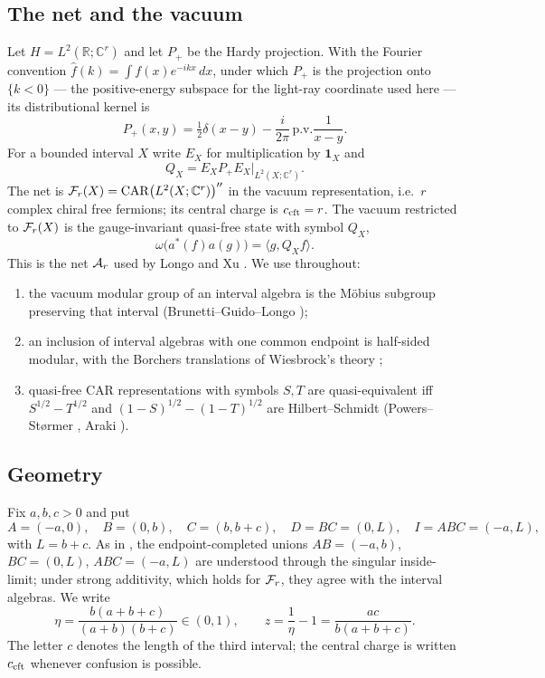 \label{sec:setting}
\subsection{The net and the vacuum}
Let $H=L^2(\mathbb R;\mathbb C^r)$ and let $P_+$ be the Hardy projection.  With the
Fourier convention $\widehat f(k)=\int f(x)e^{-ikx}\,dx$, under which $P_+$ is the
projection onto $\{k<0\}$ --- the positive-energy subspace for the light-ray
coordinate used here --- its distributional kernel is
\begin{equation}\label{eq:hardy}
 P_+(x,y)=\tfrac12\delta(x-y)-\frac{i}{2\pi}\,\mathrm{p.v.}\frac1{x-y}.
\end{equation}
For a bounded interval $X$ write $E_X$ for multiplication by $\mathbf 1_X$ and
\begin{equation}\label{eq:QX}
 Q_X=E_XP_+E_X\big|_{L^2(X;\mathbb C^r)} .
\end{equation}
The net is $\mathcal F_r(X)=\mathrm{CAR}\bigl(L^2(X;\mathbb C^r)\bigr)''$ in the vacuum
representation, i.e.\ $r$ complex chiral free fermions; its central charge is
$c_{\rm cft}=r$.  The vacuum restricted to $\mathcal F_r(X)$ is the gauge-invariant
quasi-free state with symbol $Q_X$,
\begin{equation}\label{eq:qf}
 \omega\bigl(a^*(f)a(g)\bigr)=\langle g,Q_Xf\rangle .
\end{equation}
This is the net $\mathcal A_r$ used by Longo and Xu \cite{LX}.  We use throughout:
\begin{enumerate}[label=(N\arabic*)]
\item the vacuum modular group of an interval algebra is the M\"obius subgroup
preserving that interval (Brunetti--Guido--Longo \cite{BGL});
\item an inclusion of interval algebras with one common endpoint is half-sided
modular, with the Borchers translations of Wiesbrock's theory \cite{Wiesbrock};
\item quasi-free CAR representations with symbols $S,T$ are quasi-equivalent iff
$S^{1/2}-T^{1/2}$ and $(1-S)^{1/2}-(1-T)^{1/2}$ are Hilbert--Schmidt
(Powers--St\o rmer \cite{PS70}, Araki \cite{ArakiCAR}).
\end{enumerate}

\subsection{Geometry}
Fix $a,b,c>0$ and put
\begin{equation}\label{eq:geometry}
 A=(-a,0),\quad B=(0,b),\quad C=(b,b+c),\quad D=BC=(0,L),\quad I=ABC=(-a,L),
\end{equation}
with $L=b+c$.  As in \cite{LX}, the endpoint-completed unions
$AB=(-a,b)$, $BC=(0,L)$, $ABC=(-a,L)$ are understood through the singular
inside-limit; under strong additivity, which holds for $\mathcal F_r$, they agree with
the interval algebras.  We write
\begin{equation}\label{eq:eta-z}
 \eta=\frac{b(a+b+c)}{(a+b)(b+c)}\in(0,1),\qquad
 z=\frac1\eta-1=\frac{ac}{b(a+b+c)} .
\end{equation}
The letter $c$ denotes the length of the third interval; the central charge is
written $c_{\rm cft}$ whenever confusion is possible.

